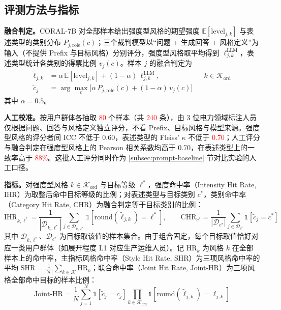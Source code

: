 \documentclass[fontset=fandol,type=master,campus=shenzhen,etitleauto=true]{hithesisbook}
\newcommand{\rev}[1]{\textcolor{red}{#1}}
\begin{document}
\subsection{评测方法与指标}\label{ux7efcux5408ux8bc4ux6d4bux6307ux6807}

\textbf{融合判定。}CORAL-7B 对全部样本给出强度型风格的期望强度 $\mathbb{E}[\text{level}_{j,k}]$ 与表述类型的类别分布 $P_{j,\text{role}}(c)$；三个裁判模型以“问题 + 生成回答 + 风格定义”为输入（不提供 Prefix 与目标风格）分别评分，强度型风格取平均得到 $\ell^{\text{LLM}}_{j,k}$，表述类型统计各类别的得票比例 $v_{j}(c)$。样本 $j$ 的融合判定为
\begin{equation}\label{eq:fused-level}
\begin{aligned}
\tilde{\ell}_{j,k} &= \alpha\, \mathbb{E}[\text{level}_{j,k}] + (1 - \alpha)\, \ell^{\text{LLM}}_{j,k}, && k \in \mathcal{K}_{\text{ord}} \\
\tilde{c}_{j} &= \arg\max_{c} \bigl[ \alpha\, P_{j,\text{role}}(c) + (1 - \alpha)\, v_{j}(c) \bigr]
\end{aligned}
\end{equation}
其中 $\alpha = 0.5$。

\textbf{人工校准。}按用户群体各抽取 \rev{80} 个样本（共 \rev{240} 条），由 3 位电力领域标注人员仅根据问题、回答与风格定义独立评分，不看 Prefix、目标风格与模型来源。强度型风格的评分者间 ICC\cite{ref76} 不低于 0.60，表述类型的 Fleiss' $\kappa$ 不低于 \rev{0.70}；人工评分与融合判定在强度型风格上的 Pearson 相关系数均高于 0.70，在表述类型上的一致率高于 \rev{88\%}。这批人工评分同时作为 \ref{subsec:prompt-baseline} 节对比实验的人工口径。

\textbf{指标。}对强度型风格 $k \in \mathcal{K}_{\text{ord}}$ 与目标等级 $\ell^*$，强度命中率（Intensity Hit Rate, IHR）为取整后命中目标等级的比例；对表述类型与目标类别 $c^*$，类别命中率（Category Hit Rate, CHR）为融合判定等于目标类别的比例：
\begin{equation}
\text{IHR}_{k,\ell^*} = \frac{1}{|\mathcal{D}_{k,\ell^*}|} \sum_{j \in \mathcal{D}_{k,\ell^*}} \mathbb{1}\!\left[\text{round}(\tilde{\ell}_{j,k}) = \ell^*\right], \qquad
\text{CHR}_{c^*} = \frac{1}{|\mathcal{D}_{c^*}|} \sum_{j \in \mathcal{D}_{c^*}} \mathbb{1}\!\left[\tilde{c}_{j} = c^*\right]
\end{equation}
其中 $\mathcal{D}_{k,\ell^*}$、$\mathcal{D}_{c^*}$ 为目标取该值的样本集合。由于组合固定，每个目标取值恰好对应一类用户群体（如展开程度 L1 对应生产运维人员）。记 $\text{HR}_k$ 为风格 $k$ 在全部样本上的命中率，主指标风格命中率（Style Hit Rate, SHR）为三项风格命中率的平均 $\text{SHR} = \frac{1}{|\mathcal{K}|}\sum_{k \in \mathcal{K}} \text{HR}_k$；联合命中率（Joint Hit Rate, Joint-HR）为三项风格全部命中目标的样本比例：
\begin{equation}\label{eq:joint-ihr}
\text{Joint-HR} = \frac{1}{N} \sum_{j=1}^{N} \mathbb{1}\!\left[\tilde{c}_{j} = c_{j}\right] \prod_{k \in \mathcal{K}_{\text{ord}}} \mathbb{1}\!\left[\text{round}(\tilde{\ell}_{j,k}) = \ell_{j,k}\right]
\end{equation}
\end{document}
